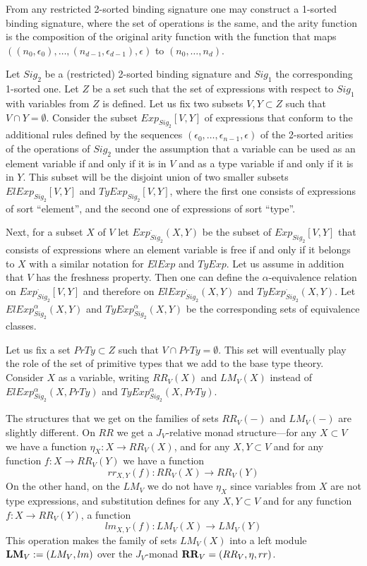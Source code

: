 \documentclass[12pt]{amsart}
\newcommand{\sr}{\rightarrow}
\newcommand{\RR}{{\bf RR}}
\newcommand{\LM}{{\bf LM}}
\begin{document}
From any restricted 2-sorted binding signature one may construct a 1-sorted binding signature,
where the set of operations is the same, and the arity function is the
composition of the original arity function with the function that maps
$((n_0,\epsilon_0),\dots,(n_{d-1},\epsilon_{d-1}),\epsilon)$ to
$(n_0,\dots,n_d)$.

Let $Sig_2$ be a (restricted) 2-sorted binding signature and $Sig_1$ the
corresponding 1-sorted one. Let $Z$ be a set such that the set of expressions
with respect to $Sig_1$ with variables from $Z$ is defined. Let us fix two
subsets $V,Y\subset Z$ such that $V\cap Y=\emptyset$. Consider the subset
$Exp_{Sig_2}[V,Y]$ of expressions that conform to the additional rules defined
by the sequences $(\epsilon_0,\dots,\epsilon_{n-1},\epsilon)$ of the 2-sorted
arities of the operations of $Sig_2$ under the assumption that a variable can
be used as an element variable if and only if it is in $V$ and as a type
variable if and only if it is in $Y$. This subset will be the disjoint union of
two smaller subsets $ElExp_{Sig_2}[V,Y]$ and $TyExp_{Sig_2}[V,Y]$, where the
first one consists of expressions of sort ``element'', and the second one of
expressions of sort ``type''.

Next, for a subset $X$ of $V$ let $Exp^{\cdot}_{Sig_2}(X,Y)$ be the subset of
$Exp_{Sig_2}[V,Y]$ that consists of expressions where an element variable is
free if and only if it belongs to $X$ with a similar notation for $ElExp$ and
$TyExp$. Let us assume in addition that $V$ has the freshness property. Then
one can define the $\alpha$-equivalence relation on $Exp^{\cdot}_{Sig_2}[V,Y]$
and therefore on $ElExp^{\cdot}_{Sig_2}(X,Y)$ and
$TyExp^{\cdot}_{Sig_2}(X,Y)$. Let $ElExp^{\alpha}_{Sig_2}(X,Y)$ and
$TyExp_{Sig_2}^{\alpha}(X,Y)$ be the corresponding sets of equivalence classes.

Let us fix a set $PrTy\subset Z$ such that $V\cap PrTy=\emptyset$. This set
will eventually play the role of the set of primitive types that we add to the
base type theory. Consider $X$ as a variable, writing $RR_V(X)$ and $LM_V(X)$
instead of $ElExp^{\alpha}_{Sig_2}(X,PrTy)$ and
$TyExp_{Sig_2}^{\alpha}(X,PrTy)$.

The structures that we get on the families of sets $RR_V(-)$ and $LM_V(-)$ are
slightly different. On $RR$ we get a $J_V$-relative monad structure---for any
$X\subset V$ we have a function $\eta_X:X\sr RR_V(X)$, and for any $X,Y\subset V$
and for any function $f:X\sr RR_V(Y)$ we have a function
%
$$rr_{X,Y}(f):RR_V(X)\sr RR_V(Y)$$
%
On the other hand, on the $LM_V$ we do not have $\eta_X$ since variables from
$X$ are not type expressions, and substitution defines for any $X,Y\subset V$
and for any function $f:X\sr RR_V(Y)$, a function
%
$$lm_{X,Y}(f):LM_V(X)\sr LM_V(Y)$$
%
This operation makes the family of sets $LM_V(X)$ into a left module
$\LM_V:=(LM_V, lm)$ over the $J_V$-monad $\RR_V=(RR_V,\eta,rr)$.
\end{document}
